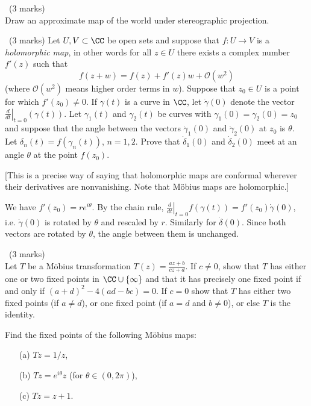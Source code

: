 \documentclass[12pt]{article}
\begin{document}
\newpage

\begin{question}\ (3 marks)\\
Draw an approximate map of the world under stereographic projection.
\end{question}

\begin{answer}

\end{answer}
\newpage

\vspace{1cm}

\begin{question}\ (3 marks)
  Let $U,V\subset\CC$ be open sets and suppose that $f\colon U\to V$ is a {\em holomorphic map}, in other words for all $z\in U$ there exists a complex number $f'(z)$ such that
  \[f(z+w)=f(z)+f'(z)w+\mathcal{O}(w^2)\]
  (where $\mathcal{O}(w^2)$ means higher order terms in $w$). Suppose that $z_0\in U$ is a point for which $f'(z_0)\neq 0$. If $\gamma(t)$ is a curve in $\CC$, let $\dot{\gamma}(0)$ denote the vector $\left.\frac{d}{dt}\right|_{t=0}(\gamma(t))$. Let $\gamma_1(t)$ and $\gamma_2(t)$ be curves with $\gamma_1(0)=\gamma_2(0)=z_0$ and suppose that the angle between the vectors $\dot{\gamma}_1(0)$ and $\dot{\gamma}_2(0)$ at $z_0$ is $\theta$. Let $\delta_n(t)=f(\gamma_n(t))$, $n=1,2$. Prove that $\dot{\delta}_1(0)$ and $\dot{\delta}_2(0)$ meet at an angle $\theta$ at the point $f(z_0)$.

  [This is a precise way of saying that holomorphic maps are conformal wherever their derivatives are nonvanishing. Note that M\"obius maps are holomorphic.]
\end{question}

\begin{answer}
  We have $f'(z_0)=re^{i\theta}$. By the chain rule, $\left.\frac{d}{dt}\right|_{t=0}f(\gamma(t))=f'(z_0)\dot{\gamma}(0)$, i.e. $\dot{\gamma}(0)$ is rotated by $\theta$ and rescaled by $r$. Similarly for $\dot{\delta}(0)$. Since both vectors are rotated by $\theta$, the angle between them is unchanged.
\end{answer}
\newpage

\vspace{1cm}

\begin{question}\ (3 marks)\\
  Let $T$ be a M\"obius transformation $T(z)=\frac{az+b}{cz+d}$. If $c\neq 0$, show that $T$ has either one or two fixed points in $\CC\cup\{\infty\}$ and that it has precisely one fixed point if and only if $(a+d)^2-4(ad-bc)=0$. If $c=0$ show that $T$ has either two fixed points (if $a\neq d$), or one fixed point (if $a=d$ and $b\neq 0$), or else $T$ is the identity.

  Find the fixed points of the following M\"obius maps:
  \begin{enumerate}
  \item[(a)] $Tz=1/z$,
  \item[(b)] $Tz=e^{i\theta}z$ (for $\theta\in(0,2\pi)$),
  \item[(c)] $Tz=z+1$.
  \end{enumerate}
\end{question}
\end{document}
